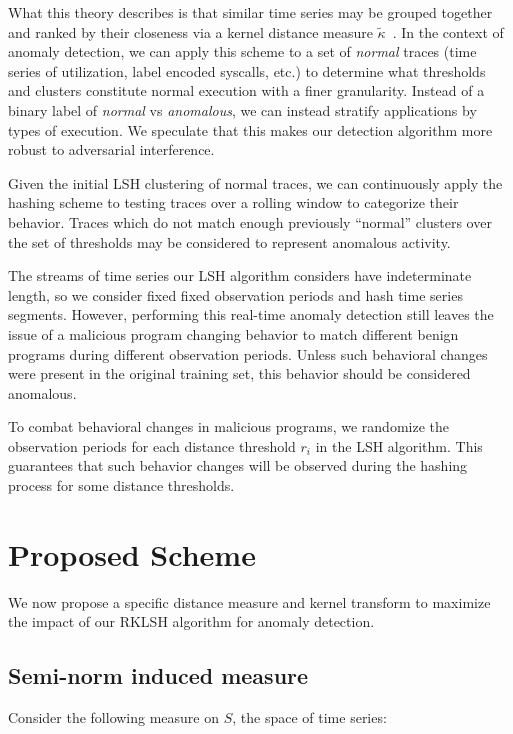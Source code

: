 \documentclass[a4paper]{article}
\theoremstyle{def}
\theoremstyle{thm}
\begin{document}
What this theory describes is that similar time series may be grouped together and ranked by their closeness via a kernel distance measure $\tilde{\kappa}$~\cite{Hachiya13-NSH}.
In the context of anomaly detection, we can apply this scheme to a set of \textit{normal} traces (time series of utilization, label encoded syscalls, etc.) to determine what thresholds and clusters constitute normal execution with a finer granularity.
Instead of a binary label of \textit{normal} vs \textit{anomalous}, we can instead stratify applications by types of execution.
We speculate that this makes our detection algorithm more robust to adversarial interference.

Given the initial LSH clustering of normal traces, we can continuously apply the hashing scheme to testing traces over a rolling window to categorize their behavior.
Traces which do not match enough previously ``normal'' clusters over the set of thresholds may be considered to represent anomalous activity.

The streams of time series our LSH algorithm considers have indeterminate length, so we consider fixed fixed observation periods and hash time series segments.
However, performing this real-time anomaly detection still leaves the issue of a malicious program changing behavior to match different benign programs during different observation periods.
Unless such behavioral changes were present in the original training set, this behavior should be considered anomalous.

To combat behavioral changes in malicious programs, we randomize the observation periods for each distance threshold $r_i$ in the LSH algorithm.
This guarantees that such behavior changes will be observed during the hashing process for some distance thresholds.

\section{Proposed Scheme}
\label{sec:proposed_scheme}

We now propose a specific distance measure and kernel transform to maximize the impact of our RKLSH algorithm for anomaly detection.

\subsection{Semi-norm induced measure}

Consider the following measure on $S$, the space of time series:
\end{document}

